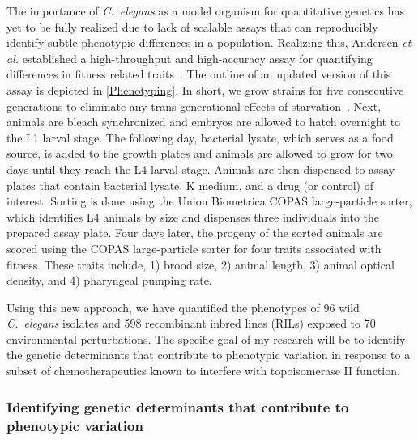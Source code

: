 \documentclass[12pt]{article}
\begin{document}
\vspace{5pt}

The importance of {\it C.~elegans} as a model organism for quantitative genetics has yet to be fully realized due to lack of scalable assays that can reproducibly identify subtle phenotypic differences in a population. Realizing this, Andersen {\it et al.} established a high-throughput and high-accuracy assay for quantifying differences in fitness related traits~\cite{Andersen:2015dm}. The outline of an updated version of this assay is depicted in \autoref{Phenotyping}. In short, we grow strains for five consecutive generations to eliminate any trans-generational  effects of starvation~\cite{Rechavi:2014ht}. Next, animals are bleach synchronized and embryos are allowed to hatch overnight to the L1 larval stage. The following day, bacterial lysate, which serves as a food source, is added to the growth plates and animals are allowed to grow for two days until they reach the L4 larval stage. Animals are then dispensed to assay plates that contain bacterial lysate, K medium, and a drug (or control) of interest. Sorting is done using the Union Biometrica COPAS large-particle sorter, which identifies L4 animals by size and dispenses three individuals into the prepared assay plate. Four days later, the progeny of the sorted animals are scored using the COPAS large-particle sorter for four traits associated with fitness. These traits include, 1) brood size, 2) animal length, 3) animal optical density, and 4) pharyngeal pumping rate. 
\vspace{5pt}

Using this new approach, we have quantified the phenotypes of 96 wild {\it C.~elegans} isolates and 598 recombinant inbred lines (RILs) exposed to 70 environmental perturbations. The specific goal of my research will be to identify the genetic determinants that contribute to phenotypic variation in response to a subset of chemotherapeutics known to interfere with topoisomerase II function.
\vspace{-10pt}
\subsubsection{Identifying genetic determinants that contribute to phenotypic variation}
\end{document}
